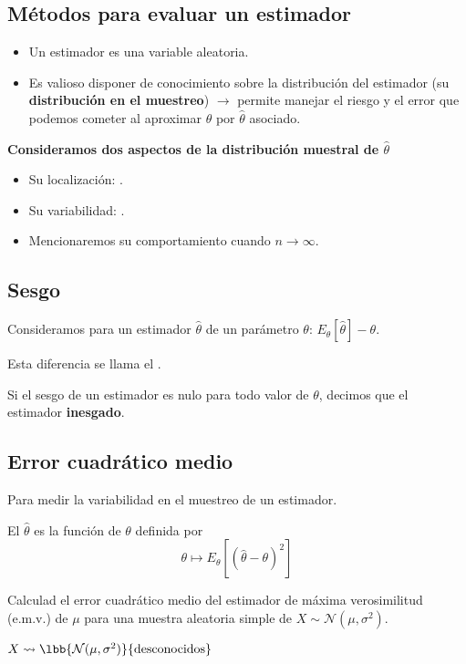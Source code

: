 \subsection{Métodos para evaluar un estimador}
\begin{tcolorbox}[colback=olive!5!white, colframe=olive!75!black, title=\textbf{Recordad}]
\begin{itemize}[label=\textbullet]
    \item Un estimador es una variable aleatoria.
    \item Es valioso disponer de conocimiento sobre la distribución del estimador (su \textbf{distribución en el muestreo}) $\longrightarrow $ permite manejar el riesgo y el error que podemos cometer al aproximar $\theta$ por $\hat{\theta}$ asociado.
\end{itemize}
\end{tcolorbox}
\textbf{Consideramos dos aspectos de la distribución muestral de $\hat{\theta}$} 
\begin{itemize}[label=\textbullet]
    \item Su localización: .
    \item Su variabilidad: .
    \item Mencionaremos su comportamiento cuando $n\to \infty$.
\end{itemize}
\subsection{Sesgo}
\begin{tcolorbox}[colback=blue!5!white, colframe=blue!75!black, title=\textbf{Definición}]
    Consideramos para un estimador $\hat{\theta}$ de un parámetro $\theta$: $E_\theta[\hat{\theta}]-\theta$.

    Esta diferencia se llama el .
\end{tcolorbox}
\begin{tcolorbox}[colback=olive!5!white, colframe=olive!75!black, title=\textbf{Una propiedad deseable para un estimador}]
Si el sesgo de un estimador es nulo para todo valor de $\theta$, decimos que el estimador \textbf{inesgado}. 
\end{tcolorbox}
\subsection{Error cuadrático medio}
Para medir la variabilidad en el muestreo de un estimador.
\begin{tcolorbox}[colback=blue!5!white, colframe=blue!75!black, title=\textbf{Definición}]
El  $\hat{\theta}$ es la función de $\theta$ definida por \[
    \theta\longmapsto E_\theta[(\hat{\theta}-\theta)^2]
\]  
\end{tcolorbox}
\begin{tcolorbox}[colback=olive!5!white, colframe=olive!75!black, title=\textbf{Para practicar}]
Calculad el error cuadrático medio del estimador de máxima verosimilitud (e.m.v.) de $\mu$ para una muestra aleatoria simple de $X\sim \mathcal{N}(\mu,\sigma^2)$.
\end{tcolorbox}
$X\leadsto \lbb{\mathcal{N}(\mu,\sigma^2)}{\text{desconocidos}} $ 

